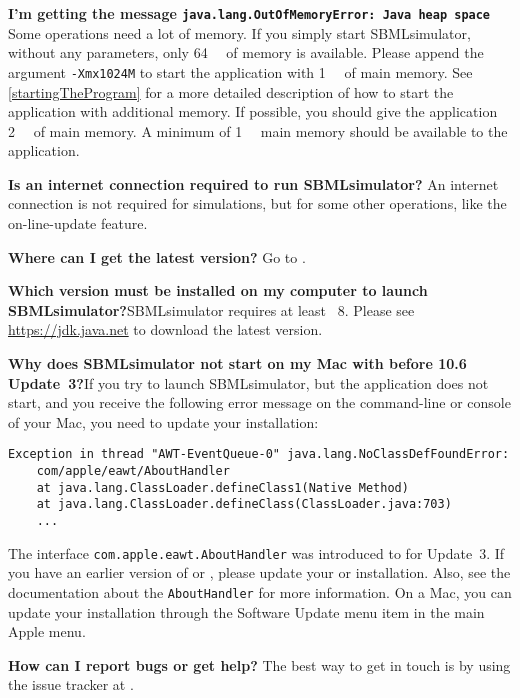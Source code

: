 \noindent \textbf{I'm getting the message \texttt{java.lang.OutOfMemoryError: Java heap space}}\newline
Some operations need a lot of memory. If you simply start SBMLsimulator, without any
\JVM parameters, only \SI{64}{\mega\byte} of memory is available.
Please append the argument \texttt{-Xmx1024M} to start the application with \SI{1}{\giga\byte} of main memory.
See \cref{startingTheProgram} for a more detailed description of how to start the application with additional memory.
If possible, you should give the application \SI{2}{\giga\byte} of main memory.
A minimum of \SI{1}{\giga\byte} main memory should be available to the application.\newline

\noindent \textbf{Is an internet connection required to run SBMLsimulator?}\newline
An internet connection is not required for simulations, but for some other operations,
like the on-line-update feature.\newline

\noindent \textbf{Where can I get the latest version?}\newline
Go to .\newline

\noindent \textbf{Which \Java version must be installed on my computer to launch
SBMLsimulator?}\newline SBMLsimulator requires at least \Java~8.
Please see \url{https://jdk.java.net} to download the latest \Java version.\newline

\noindent \textbf{Why does SBMLsimulator not start on my Mac with \MacOSX before
10.6 Update~3?}\newline If you try to launch SBMLsimulator, but the application does
not start, and you receive the following error message on the command-line or
\Java console of your Mac, you need to update your \Java installation:
\begin{verbatim}
Exception in thread "AWT-EventQueue-0" java.lang.NoClassDefFoundError:
    com/apple/eawt/AboutHandler
    at java.lang.ClassLoader.defineClass1(Native Method)
    at java.lang.ClassLoader.defineClass(ClassLoader.java:703)
    ...
\end{verbatim}
The interface \texttt{com.apple.eawt.AboutHandler} was introduced to \Java for
 Update~3. If you have an earlier version of \MacOSX or \Java,
please update your \OS or \Java installation.
Also, see the \MacOSX documentation about the \texttt{AboutHandler} for more information. On a Mac, you can update your \Java installation through the Software Update menu item in the main Apple menu.\newline

\noindent \textbf{How can I report bugs or get help?}\newline
The best way to get in touch is by using the issue tracker at .
